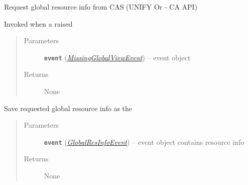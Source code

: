 \documentclass[letterpaper,10pt,english]{sphinxmanual}
\begin{document}
\begin{fulllineitems}
\begin{fulllineitems}
\begin{quote}
\begin{description}
\end{description}\end{quote}

\end{fulllineitems}


\begin{fulllineitems}
\label{orchest/ros_API:escape.orchest.ros_API.ResourceOrchestrationAPI._handle_MissingGlobalViewEvent}
Request global resource info from CAS (UNIFY Or - CA API)

Invoked when a  raised
\begin{quote}\begin{description}
\item[{Parameters}] \leavevmode
\textbf{\texttt{event}} ({\hyperref[orchest/virtualization_mgmt:escape.orchest.virtualization_mgmt.MissingGlobalViewEvent]{\emph{\emph{MissingGlobalViewEvent}}}}) -- event object

\item[{Returns}] \leavevmode
None

\end{description}\end{quote}

\end{fulllineitems}


\begin{fulllineitems}
\label{orchest/ros_API:escape.orchest.ros_API.ResourceOrchestrationAPI._handle_GlobalResInfoEvent}
Save requested global resource info as the 
\begin{quote}\begin{description}
\item[{Parameters}] \leavevmode
\textbf{\texttt{event}} ({\hyperref[adapt/cas_API:escape.adapt.cas_API.GlobalResInfoEvent]{\emph{\emph{GlobalResInfoEvent}}}}) -- event object contains resource info

\item[{Returns}] \leavevmode
None

\end{description}\end{quote}


\end{fulllineitems}
\end{fulllineitems}
\end{document}
